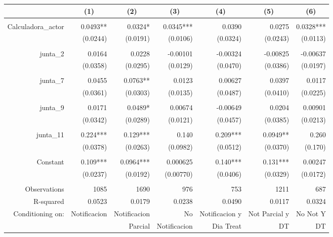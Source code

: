 \begin{tabular}{rrrrrrr}
\toprule
\multicolumn{1}{c}{} & \multicolumn{1}{c}{(1)} & \multicolumn{1}{c}{(2)} & \multicolumn{1}{c}{(3)} & \multicolumn{1}{c}{(4)} & \multicolumn{1}{c}{(5)} & \multicolumn{1}{c}{(6)} \\
\midrule
      &       &       &       &       &       &  \\
Calculadora\_actor & 0.0493** & 0.0324* & 0.0345*** & 0.0390 & 0.0275 & 0.0328*** \\
      & (0.0244) & (0.0191) & (0.0106) & (0.0324) & (0.0243) & (0.0113) \\
      &       &       &       &       &       &  \\
junta\_2 & 0.0164 & 0.0228 & -0.00101 & -0.00324 & -0.00825 & -0.00637 \\
      & (0.0358) & (0.0295) & (0.0129) & (0.0470) & (0.0386) & (0.0197) \\
      &       &       &       &       &       &  \\
junta\_7 & 0.0455 & 0.0763** & 0.0123 & 0.00627 & 0.0397 & 0.0117 \\
      & (0.0361) & (0.0303) & (0.0135) & (0.0487) & (0.0410) & (0.0225) \\
      &       &       &       &       &       &  \\
junta\_9 & 0.0171 & 0.0489* & 0.00674 & -0.00649 & 0.0204 & 0.00901 \\
      & (0.0342) & (0.0289) & (0.0121) & (0.0457) & (0.0385) & (0.0213) \\
      &       &       &       &       &       &  \\
junta\_11 & 0.224*** & 0.129*** & 0.140 & 0.209*** & 0.0949** & 0.260 \\
      & (0.0378) & (0.0263) & (0.0982) & (0.0512) & (0.0370) & (0.170) \\
      &       &       &       &       &       &  \\
Constant  & 0.109*** & 0.0964*** & 0.000625 & 0.140*** & 0.131*** & 0.00247 \\
      & (0.0237) & (0.0192) & (0.00770) & (0.0406) & (0.0329) & (0.0172) \\
      &       &       &       &       &       &  \\
Observations & 1085  & 1690  & 976   & 753   & 1211  & 687 \\
R-squared & 0.0523 & 0.0179 & 0.0238 & 0.0490 & 0.0117 & 0.0324 \\
Conditioning on:   & Notificacion & Notificacion & No    & Notificacion y  & Not Parcial y  & No Not Y \\
      &       & Parcial & Notificacion & Dia Treat & DT    & DT \\
\bottomrule
\end{tabular}%
